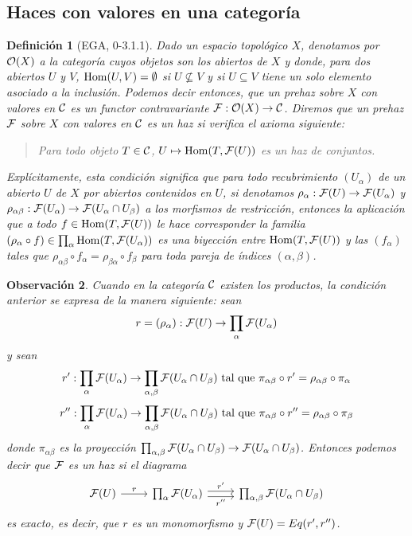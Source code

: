 \documentclass[twoside]{article}
\newtheorem{defin}{Definición}[section]
\newtheorem{obs}[defin]{Observación}
\begin{document}
\subsection{Haces con valores en una categoría}

\begin{defin}[EGA, 0-3.1.1]\label{axioma}
Dado un espacio topológico $X$, denotamos por ${\mathcal O}(X)$ a la categoría cuyos objetos son los abiertos de $X$ y donde, para dos abiertos $U$ y $V$, $\operatorname{Hom}(U,V)=\emptyset$ si $U\not\subseteq V$ y si $U\subseteq V$ tiene un solo elemento asociado a la inclusión. Podemos decir entonces, que un \emph{prehaz sobre $X$ con valores en ${\mathcal C}$} es un functor contravariante $\mathcal{F}:{\mathcal O}(X)\to{\mathcal C}$. Diremos que un prehaz $\mathcal{F}$ sobre $X$ con valores en ${\mathcal C}$ es un \emph{haz} si verifica el axioma siguiente:

\begin{verse}
Para todo objeto $T\in{\mathcal C}$, $U\mapsto\operatorname{Hom}(T,\mathcal{F}(U))$ es un haz de conjuntos. %
\end{verse}

Explícitamente, esta condición significa que para todo recubrimiento $(U_\alpha)$ de un abierto $U$ de $X$ por abiertos contenidos en $U$, si denotamos $\rho_\alpha:\mathcal{F}(U)\to\mathcal{F}(U_\alpha)$ y $\rho_{\alpha\beta}:\mathcal{F}(U_\alpha)\to\mathcal{F}(U_\alpha\cap U_\beta)$ a los morfismos de restricción, entonces la aplicación que a todo $f\in\operatorname{Hom}(T,\mathcal{F}(U))$ le hace corresponder la familia $(\rho_\alpha\circ f)\in \prod_\alpha\operatorname{Hom}(T,\mathcal{F}(U_\alpha))$ es una biyección entre $\operatorname{Hom}(T,\mathcal{F}(U))$ y las $(f_\alpha)$ tales que $\rho_{\alpha\beta}\circ f_\alpha=\rho_{\beta\alpha}\circ f_\beta$ para toda pareja de índices $(\alpha,\beta)$. 
\end{defin}

\begin{obs}\label{ecualizador}
Cuando en la categoría ${\mathcal C}$ existen los productos, la condición anterior se expresa de la manera siguiente: sean
\[
r=(\rho_\alpha):\mathcal{F}(U)\to\prod_\alpha\mathcal{F}(U_\alpha)
\]
y sean
\[
r':\prod_\alpha\mathcal{F}(U_\alpha)\to\prod_{\alpha,\beta}\mathcal{F}(U_\alpha\cap U_\beta)\text{ tal que }\pi_{\alpha\beta}\circ r'=\rho_{\alpha\beta}\circ \pi_{\alpha}
\]
\[
r'':\prod_\alpha\mathcal{F}(U_\alpha)\to\prod_{\alpha,\beta}\mathcal{F}(U_\alpha\cap U_\beta)\text{ tal que }\pi_{\alpha\beta}\circ r''=\rho_{\alpha\beta}\circ \pi_{\beta}
\]
donde $\pi_{\alpha\beta}$ es la proyección $\prod_{\alpha,\beta}\mathcal{F}(U_\alpha\cap U_\beta)\to \mathcal{F}(U_\alpha\cap U_\beta)$. Entonces podemos decir que $\mathcal{F}$ es un haz si el diagrama
\[
\begin{tikzcd}
\calF(U)\arrow[r, "r"]&\prod_\alpha\calF(U_\alpha)\arrow[r, shift left, "r'"]\arrow[r, shift right, "r''"'] &\prod_{\alpha,\beta}\calF(U_\alpha\cap U_\beta)
\end{tikzcd}
\]
es exacto, es decir, que $r$ es un monomorfismo y $\mathcal{F}(U)=Eq(r',r'')$. %
\end{obs}
\end{document}
